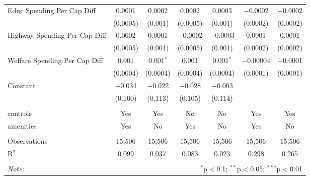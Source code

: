 \begin{table}[!htbp]
\begin{tabular}{@{\extracolsep{5pt}}lcccccc}
  Educ Spending Per Cap Diff & 0.0001 & 0.0002 & 0.0002 & 0.0003 & $-$0.0002 & $-$0.0002 \\ 
  & (0.0005) & (0.001) & (0.0005) & (0.001) & (0.0002) & (0.0002) \\ 
  Highway Spending Per Cap Diff & 0.0002 & 0.0001 & $-$0.0002 & $-$0.0003 & 0.0001 & 0.0001 \\ 
  & (0.0005) & (0.001) & (0.0005) & (0.001) & (0.0002) & (0.0002) \\ 
  Welfare Spending Per Cap Diff & 0.001 & 0.001$^{*}$ & 0.001 & 0.001$^{*}$ & $-$0.00004 & $-$0.0001 \\ 
  & (0.0004) & (0.0004) & (0.0004) & (0.0004) & (0.0001) & (0.0001) \\ 
  Constant & $-$0.034 & $-$0.022 & $-$0.028 & $-$0.003 &  &  \\ 
  & (0.100) & (0.113) & (0.105) & (0.114) &  &  \\ 
 \hline \\[-1.8ex] 
controls & Yes & Yes & No & No & Yes & Yes \\ 
amenities & Yes & No & Yes & No & Yes & No \\ 
\hline \\[-1.8ex] 
Observations & 15,506 & 15,506 & 15,506 & 15,506 & 15,506 & 15,506 \\ 
R$^{2}$ & 0.099 & 0.037 & 0.083 & 0.023 & 0.298 & 0.265 \\ 
\hline 
\hline \\[-1.8ex] 
\textit{Note:}  & \multicolumn{6}{r}{$^{*}$p$<$0.1; $^{**}$p$<$0.05; $^{***}$p$<$0.01} \\ 
\end{tabular} 
\end{table} 
